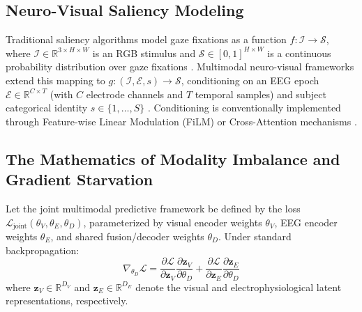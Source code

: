 \documentclass[journal,twocolumn]{IEEEtran}
\begin{document}
\subsection{Neuro-Visual Saliency Modeling}
Traditional saliency algorithms model gaze fixations as a function $f: \mathcal{I} \to \mathcal{S}$, where $\mathcal{I} \in \mathbb{R}^{3 \times H \times W}$ is an RGB stimulus and $\mathcal{S} \in [0, 1]^{H \times W}$ is a continuous probability distribution over gaze fixations \cite{cornia2018predicting}. Multimodal neuro-visual frameworks extend this mapping to $g: (\mathcal{I}, \mathcal{E}, s) \to \mathcal{S}$, conditioning on an EEG epoch $\mathcal{E} \in \mathbb{R}^{C \times T}$ (with $C$ electrode channels and $T$ temporal samples) and subject categorical identity $s \in \{1, \dots, S\}$ \cite{gifford2022alljoined}. Conditioning is conventionally implemented through Feature-wise Linear Modulation (FiLM) \cite{perez2018film} or Cross-Attention mechanisms \cite{vaswani2017attention}.

\subsection{The Mathematics of Modality Imbalance and Gradient Starvation}
Let the joint multimodal predictive framework be defined by the loss $\mathcal{L}_{\text{joint}}(\theta_V, \theta_E, \theta_D)$, parameterized by visual encoder weights $\theta_V$, EEG encoder weights $\theta_E$, and shared fusion/decoder weights $\theta_D$. Under standard backpropagation:
\begin{equation}
\nabla_{\theta_D} \mathcal{L} = \frac{\partial \mathcal{L}}{\partial \mathbf{z}_V} \frac{\partial \mathbf{z}_V}{\partial \theta_D} + \frac{\partial \mathcal{L}}{\partial \mathbf{z}_E} \frac{\partial \mathbf{z}_E}{\partial \theta_D}
\end{equation}
where $\mathbf{z}_V \in \mathbb{R}^{D_V}$ and $\mathbf{z}_E \in \mathbb{R}^{D_E}$ denote the visual and electrophysiological latent representations, respectively.
\end{document}
